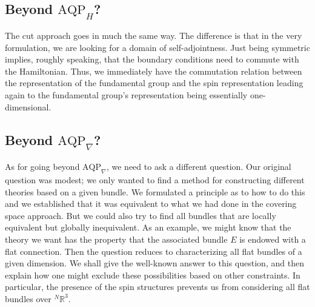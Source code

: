 \documentclass[11pt]{article}
\theoremstyle{remark}
\begin{document}
\subsection{Beyond \ensuremath{\text{AQP}_{H}}?}

The cut approach goes in much the same way. The difference is that in
the very formulation, we are looking for a domain of
self-adjointness. Just being symmetric implies, 
roughly speaking, that the boundary
conditions need to commute with the Hamiltonian. Thus, we immediately
have the commutation relation between the representation of the
fundamental group and the spin representation leading again to the
fundamental group's representation being essentially one-dimensional.

\subsection{Beyond \ensuremath{\text{AQP}_{\nabla}}?}

As for going beyond \ensuremath{\text{AQP}_{\nabla}}, we need to ask a different
question. Our original question was modest; we only wanted to find a
method for constructing different theories based on a given bundle. We
formulated a principle as to how to do this and we established that it
was equivalent to what we had done in the covering space approach. But
we could also try to find all bundles
that are locally equivalent but
globally inequivalent. As an example, we might know that the theory we
want has the property that the associated bundle $E$ is endowed with a
flat connection. Then the question reduces to characterizing all flat
bundles of a given dimension.
We shall give the well-known answer to this question, and
then explain how one might exclude these possibilities based on other
constraints. In particular, the presence of the spin structures
prevents us from considering all flat bundles
 over \ensuremath{{}^N\ensuremath{\mathbb{R}^{\ensuremath{3}}}}. 
\end{document}
